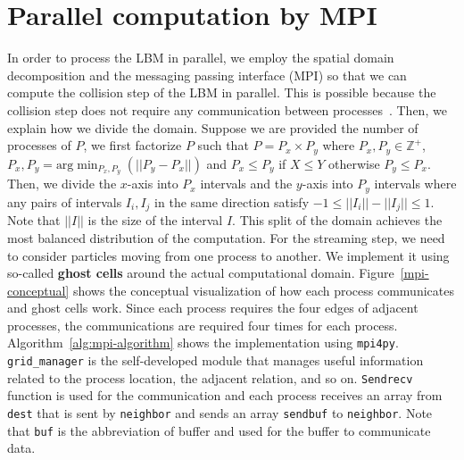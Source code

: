 \section{Parallel computation by MPI}\label{section-mpi}
In order to process the LBM in parallel,
we employ the spatial domain decomposition and
the messaging passing interface (MPI)
so that we can compute the collision step of the LBM
in parallel.
This is possible because the collision step does not require
any communication between processes~\cite{pastewka2019hpc}.
Then, we explain how we divide the domain.
Suppose we are provided the number of processes of $P$,
we first factorize $P$ such that $P = P_x \times P_y$
where $P_x, P_y \in \mathbb{Z}^{+}$,
$P_x, P_y = \text{arg} \min_{P_x, P_y}(|| P_y - P_x ||)$
and $P_x \leq P_y$ if $X \leq Y$ otherwise $P_y \leq P_x$.
Then, we divide the $x$-axis into $P_x$ intervals and
the $y$-axis into $P_y$ intervals where
any pairs of intervals $I_{i}, I_{j}$ in the same direction satisfy
$-1 \leq || I_{i} || - ||I_{j}|| \leq 1$.
Note that $||I||$ is the size of the interval $I$.
This split of the domain achieves the most balanced distribution of
the computation.
For the streaming step, we need to consider particles
moving from one process to another.
We implement it using so-called {\bf ghost cells}
around the actual computational domain.
Figure~\ref{mpi-conceptual} shows the conceptual visualization of
how each process communicates and ghost cells work.
Since each process requires the four edges of adjacent
processes, the communications are required four times
for each process.
Algorithm~\ref{alg:mpi-algorithm}
shows the implementation using {\tt mpi4py}.
{\tt grid\_manager} is the self-developed module
that manages useful information related to
the process location, the adjacent relation, and so on.
{\tt Sendrecv} function is used for the communication and
each process receives an array from {\tt dest} that is sent
by {\tt neighbor} and sends an array {\tt sendbuf} to
{\tt neighbor}.
Note that {\tt buf} is the abbreviation of buffer and
used for the buffer to communicate data.


